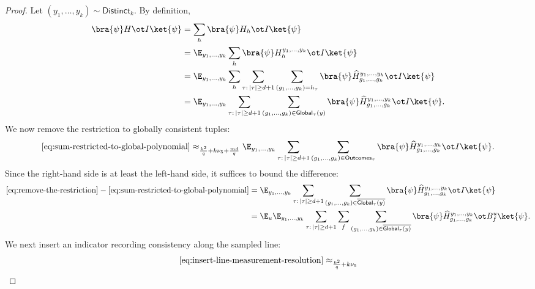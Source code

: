 \begin{proof}
	\leanok
	Let $(y_1,\dots,y_k)\sim \mathsf{Distinct}_k$. By definition,
	\begin{align}
		\bra{\psi} H \ot I \ket{\psi}
		 & =
		\sum_h \bra{\psi} H_h \ot I \ket{\psi}\nonumber                                    \\
		 & =
		\E_{y_1,\dots,y_k} \sum_h \bra{\psi} H_h^{y_1,\dots,y_k} \ot I \ket{\psi}\nonumber \\
		 & =
		\E_{y_1,\dots,y_k} \sum_h \sum_{\tau:\,|\tau|\ge d+1}
		\sum_{(g_1,\dots,g_k)=h_\tau}
		\bra{\psi} \widehat H_{g_1,\dots,g_k}^{y_1,\dots,y_k} \ot I \ket{\psi}\nonumber    \\
		 & =
		\E_{y_1,\dots,y_k} \sum_{\tau:\,|\tau|\ge d+1}
		\sum_{(g_1,\dots,g_k)\in \mathsf{Global}_\tau(y)}
		\bra{\psi} \widehat H_{g_1,\dots,g_k}^{y_1,\dots,y_k} \ot I \ket{\psi}.
		\label{eq:sum-restricted-to-global-polynomial}
	\end{align}
	We now remove the restriction to globally consistent tuples:
	\begin{equation}\label{eq:remove-the-restriction}
		\eqref{eq:sum-restricted-to-global-polynomial}
		\approx_{\frac{k^2}{q}+k\nu_5+\frac{md}{q}}
		\E_{y_1,\dots,y_k} \sum_{\tau:\,|\tau|\ge d+1}
		\sum_{(g_1,\dots,g_k)\in \mathsf{Outcomes}_\tau}
		\bra{\psi} \widehat H_{g_1,\dots,g_k}^{y_1,\dots,y_k} \ot I \ket{\psi}.
	\end{equation}
	Since the right-hand side is at least the left-hand side, it suffices to bound the difference:
	\begin{align}
		\eqref{eq:remove-the-restriction} - \eqref{eq:sum-restricted-to-global-polynomial}
		 & =
		\E_{y_1,\dots,y_k} \sum_{\tau:\,|\tau|\ge d+1}
		\sum_{(g_1,\dots,g_k)\in \overline{\mathsf{Global}_\tau(y)}}
		\bra{\psi} \widehat H_{g_1,\dots,g_k}^{y_1,\dots,y_k} \ot I \ket{\psi}\nonumber \\
		 & =
		\E_u \E_{y_1,\dots,y_k} \sum_{\tau:\,|\tau|\ge d+1} \sum_f
		\sum_{(g_1,\dots,g_k)\in \overline{\mathsf{Global}_\tau(y)}}
		\bra{\psi} \widehat H_{g_1,\dots,g_k}^{y_1,\dots,y_k} \ot B_f^u \ket{\psi}.
		\label{eq:insert-line-measurement-resolution}
	\end{align}
	We next insert an indicator recording consistency along the sampled line:
	\begin{equation}\label{eq:insert-line-consistency-indicator}
		\eqref{eq:insert-line-measurement-resolution}
		\approx_{\frac{k^2}{q}+k\nu_5}

\end{equation}
\end{proof}

